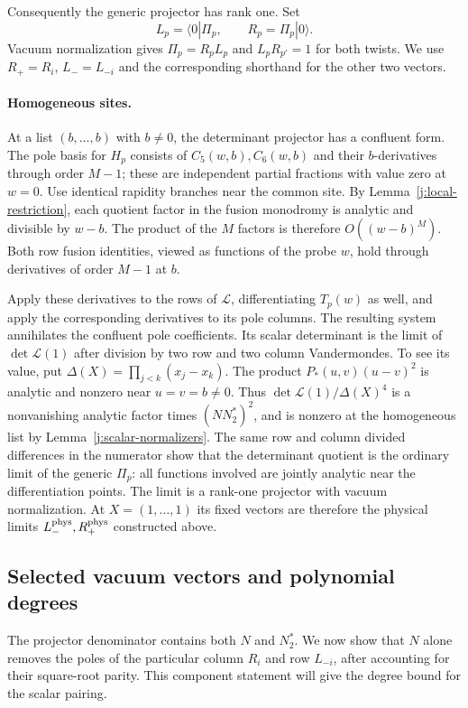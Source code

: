 Consequently the generic projector has rank one. Set
\[
L_p=\langle0|\Pi_p,\qquad R_p=\Pi_p|0\rangle.
\]
Vacuum normalization gives
$\Pi_p=R_pL_p$ and $L_pR_{p'}=1$ for both twists.
We use $R_+=R_i$, $L_-=L_{-i}$ and the corresponding shorthand for
the other two vectors.

\paragraph{Homogeneous sites.}
At a list $(b,\ldots,b)$ with $b\ne0$, the determinant projector has
a confluent form. The pole basis for $H_p$ consists of
$C_5(w,b),C_6(w,b)$ and their $b$-derivatives through order $M-1$;
these are independent partial fractions with value zero at $w=0$.
Use identical rapidity branches near the common site. By
Lemma~\ref{j:local-restriction}, each quotient factor in the fusion
monodromy is analytic and divisible by $w-b$. The product of the
$M$ factors is therefore $O((w-b)^M)$. Both row fusion identities,
viewed as functions of the probe $w$, hold through derivatives of
order $M-1$ at $b$.

Apply these derivatives to the rows of $\mathcal L$, differentiating
$T_p(w)$ as well, and apply the corresponding derivatives to its pole
columns. The resulting system annihilates the confluent pole
coefficients. Its scalar determinant is the limit of
$\det\mathcal L(1)$ after division by two row and two column
Vandermondes. To see its value, put
$\Delta(X)=\prod_{j<k}(x_j-x_k)$. The product
$P_*(u,v)(u-v)^2$ is analytic and nonzero near $u=v=b\ne0$.
Thus $\det\mathcal L(1)/\Delta(X)^4$ is a nonvanishing analytic
factor times $(NN_2^*)^2$, and is nonzero at the homogeneous list
by Lemma~\ref{j:scalar-normalizers}.
The same row and column divided differences in the numerator show
that the determinant quotient is the ordinary limit of the generic
$\Pi_p$: all functions involved are jointly analytic near the
differentiation points. The limit is a rank-one projector with vacuum
normalization. At $X=(1,\ldots,1)$ its fixed vectors are therefore
the physical limits $L_-^{\rm phys},R_+^{\rm phys}$ constructed above.

\subsection{Selected vacuum vectors and polynomial degrees}

The projector denominator contains both $N$ and $N_2^*$. We now show
that $N$ alone removes the poles of the particular column $R_i$ and
row $L_{-i}$, after accounting for their square-root parity. This
component statement will give the degree bound for the scalar pairing.

